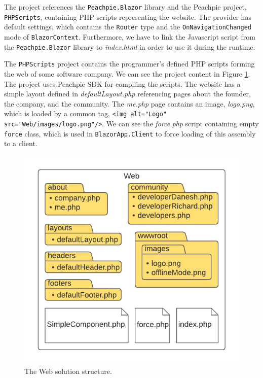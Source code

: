 \par
The project references the \texttt{Peachpie.Blazor} library and the Peachpie project, \texttt{PHPScripts}, containing PHP scripts representing the website.
The provider has default settings, which contains the \texttt{Router} type and the \texttt{OnNavigationChanged} mode of \texttt{BlazorContext}.
Furthermore, we have to link the Javascript script from the \texttt{Peachpie.Blazor} library to \textit{index.html} in order to use it during the runtime.
\par
The \texttt{PHPScripts} project contains the programmer's defined PHP scripts forming the web of some software company.
We can see the project content in Figure \ref{img22:web}.
The project uses Peachpie \ac{SDK} for compiling the scripts.
The website has a simple layout defined in \textit{defaultLayout.php} referencing pages about the founder, the company, and the community.
The \textit{me.php} page contains an image, \textit{logo.png}, which is loaded by a common tag, \texttt{<img alt="Logo" src="Web/images/logo.png"/>}.
We can see the \textit{force.php} script containing empty \texttt{force} class, which is used in \texttt{BlazorApp.Client} to force loading of this assembly to a client.
\par
\begin{figure}\centering
\includegraphics[scale=0.9]{./img/WebStructure}
\caption{The Web solution structure.}
\label{img22:web}
\end{figure} 
